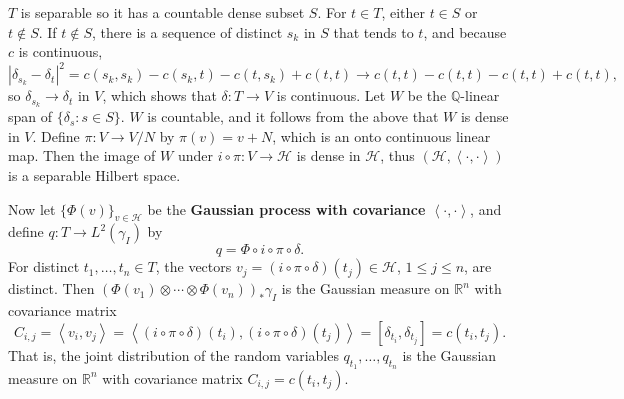 \documentclass{article}
\newcommand{\inner}[2]{\left\langle #1, #2 \right\rangle}
\theoremstyle{definition}
\begin{document}
$T$ is separable so it has  a countable dense subset $S$.
 For $t \in T$,
 either $t \in S$ or $t \not \in S$. If $t \not \in S$, 
  there is a sequence of distinct $s_k$ in $S$ that tends to $t$, and 
  because $c$ is continuous,
\[
|\delta_{s_k}-\delta_t|^2 = c(s_k,s_k)-c(s_k,t)-c(t,s_k)+c(t,t) \to c(t,t)-c(t,t)-c(t,t)+c(t,t),
\]
so $\delta_{s_k} \to \delta_t$ in $V$, which shows that $\delta:T \to V$ is continuous.
Let $W$ be the $\mathbb{Q}$-linear span of $\{\delta_s: s \in S\}$. $W$ is countable, and it follows from the above that 
$W$ is dense in $V$. 
Define $\pi:V \to V/N$ by $\pi(v)=v+N$, which is an onto continuous linear map.
Then the image of $W$ under $i \circ \pi:V \to \mathscr{H}$ is dense in $\mathscr{H}$, thus
$(\mathscr{H},\inner{\cdot}{\cdot})$ is a separable Hilbert space.



Now let $\{\Phi(v)\}_{v \in \mathscr{H}}$ be the \textbf{Gaussian process with covariance $\inner{\cdot}{\cdot}$},
and define $q:T \to L^2(\gamma_I)$ by
\[
q = \Phi \circ i \circ \pi \circ \delta.
\]
For distinct $t_1,\ldots,t_n \in T$, the vectors $v_j=(i \circ \pi \circ \delta)(t_j) \in \mathscr{H}$, $1 \leq j \leq n$, are distinct.
Then $(\Phi(v_1) \otimes \cdots \otimes \Phi(v_n))_* \gamma_I$ is the Gaussian measure on $\mathbb{R}^n$
with covariance matrix
\[
C_{i,j}=\inner{v_i}{v_j}=\inner{(i \circ \pi \circ \delta)(t_i)}{(i \circ \pi \circ \delta)(t_j)}
=[\delta_{t_i},\delta_{t_j}]
=c(t_i,t_j).
\]
That is, the joint distribution of the random variables
$q_{t_1},\ldots,q_{t_n}$ is the Gaussian measure on $\mathbb{R}^n$ with covariance
matrix $C_{i,j}=c(t_i,t_j)$. 
\end{document}
